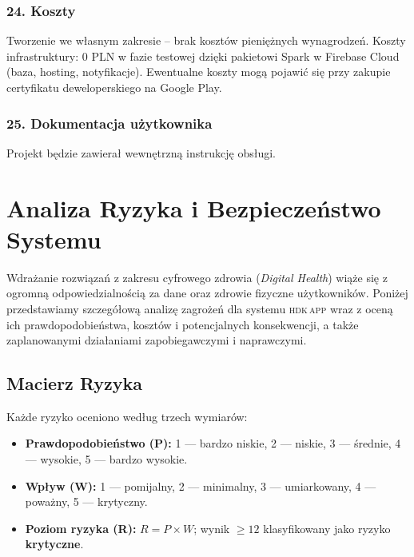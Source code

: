 \documentclass[11pt, a4paper]{article}
\newcommand{\sys}{\textsc{hdk\,app}\xspace}
\begin{document}
\subsubsection{24. Koszty}
Tworzenie we własnym zakresie – brak kosztów pieniężnych wynagrodzeń. Koszty infrastruktury: 0 PLN w fazie testowej dzięki pakietowi Spark w Firebase Cloud (baza, hosting, notyfikacje). Ewentualne koszty mogą pojawić się przy zakupie certyfikatu deweloperskiego na Google Play.

\subsubsection{25. Dokumentacja użytkownika}
Projekt będzie zawierał wewnętrzną instrukcję obsługi.
\section{Analiza Ryzyka i Bezpieczeństwo Systemu}

Wdrażanie rozwiązań z zakresu cyfrowego zdrowia (\textit{Digital Health}) wiąże się z ogromną odpowiedzialnością za dane oraz zdrowie fizyczne użytkowników. Poniżej przedstawiamy szczegółową analizę zagrożeń dla systemu \sys wraz z oceną ich prawdopodobieństwa, kosztów i potencjalnych konsekwencji, a także zaplanowanymi działaniami zapobiegawczymi i naprawczymi.

\subsection{Macierz Ryzyka}

\noindent Każde ryzyko oceniono według trzech wymiarów:
\begin{itemize}
  \item \textbf{Prawdopodobieństwo (P):} 1 — bardzo niskie, 2 — niskie, 3 — średnie, 4 — wysokie, 5 — bardzo wysokie.
  \item \textbf{Wpływ (W):} 1 — pomijalny, 2 — minimalny, 3 — umiarkowany, 4 — poważny, 5 — krytyczny.
  \item \textbf{Poziom ryzyka (R):} $R = P \times W$; wynik $\geq 12$ klasyfikowany jako ryzyko \textbf{krytyczne}.
\end{itemize}
\end{document}
